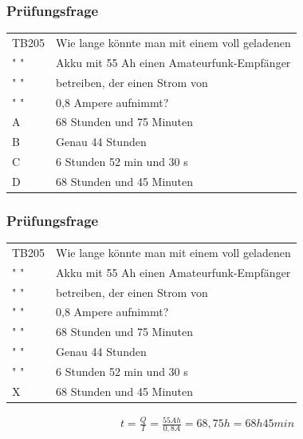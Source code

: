 \begin{frame}
    \frametitle{Prüfungsfrage}
    \begin{center}
    \begin{tabular}{l||l}\hline
        TB205 & Wie lange könnte man mit einem voll geladenen\\
        " " & Akku mit 55 Ah einen Amateurfunk-Empfänger\\ 
        " " & betreiben, der einen Strom von\\ 
        " " & 0,8 Ampere aufnimmt?\\ \hline\hline
         A & 68 Stunden und 75 Minuten \\ \hline
         B & Genau 44 Stunden \\ \hline
         C & 6 Stunden 52 min und 30 s \\\hline
         D & 68 Stunden und 45 Minuten \\\hline
    \end{tabular}
 	\end{center}
\end{frame}

\begin{frame}
    \frametitle{Prüfungsfrage}
    \begin{center}
    \begin{tabular}{l||l}\hline
        TB205 & Wie lange könnte man mit einem voll geladenen\\
        " " & Akku mit 55 Ah einen Amateurfunk-Empfänger\\ 
        " " & betreiben, der einen Strom von\\ 
        " " & 0,8 Ampere aufnimmt?\\ \hline\hline
         " " & 68 Stunden und 75 Minuten \\ \hline
         " " & Genau 44 Stunden \\ \hline
         " " & 6 Stunden 52 min und 30 s \\\hline
         X & 68 Stunden und 45 Minuten \\\hline
    \end{tabular}
        \begin{align} 
			t = \frac{Q}{I} = \frac{55 Ah}{0,8 A} = 68,75 h = 68 h 45 min
		\end{align}
 	\end{center}
 	
\end{frame}

